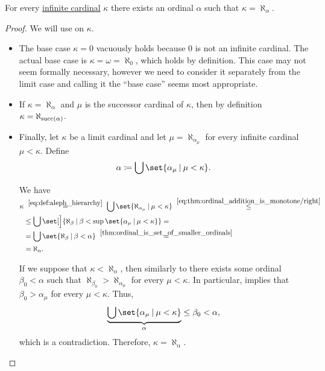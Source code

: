 \begin{proposition}\label{thm:infinite_cardinal_is_aleph}
  For every \hyperref[def:set_finiteness]{infinite cardinal} \( \kappa \) there exists an ordinal \( \alpha \) such that \( \kappa = \aleph_\alpha \).
\end{proposition}
\begin{proof}
  We will use  on \( \kappa \).

  \begin{itemize}
    \item The base case \( \kappa = 0 \) vacuously holds because \( 0 \) is not an infinite cardinal. The actual base case is \( \kappa = \omega = \aleph_0 \), which holds by definition. This case may not seem formally necessary, however we need to consider it separately from the limit case and calling it the \enquote{base case} seems most appropriate.

    \item If \( \kappa = \aleph_\alpha \) and \( \mu \) is the successor cardinal of \( \kappa \), then by definition \( \kappa = \aleph_{\operatorname{succ}(\alpha)} \).

    \item Finally, let \( \kappa \) be a limit cardinal and let \( \mu = \aleph_{\alpha_\mu} \) for every infinite cardinal \( \mu < \kappa \). Define
    \begin{equation*}
      \alpha \coloneqq \bigcup\set{ \alpha_\mu \given \mu < \kappa }.
    \end{equation*}

    We have
    \begin{align*}
      \kappa
      &\reloset {\eqref{eq:def:aleph_hierarchy}} =
      \bigcup\set{ \aleph_{\alpha_\mu} \given \mu < \kappa }
      \reloset {\eqref{eq:thm:ordinal_addition_is_monotone/right}} \leq \\ &\leq
      \bigcup\set[\Big]{ \aleph_\beta \given \beta < \sup\set{ \alpha_\mu \given \mu < \kappa } }
      = \\ &=
      \bigcup\set{ \aleph_\beta \given \beta < \alpha }
      \reloset {\ref{thm:ordinal_is_set_of_smaller_ordinals}} = \\ &=
      \aleph_\alpha.
    \end{align*}

    If we suppose that \( \kappa < \aleph_\alpha \), then similarly to  there exists some ordinal \( \beta_0 < \alpha \) such that \( \aleph_{\beta_0} > \aleph_{\alpha_\mu} \) for every \( \mu < \kappa \). In particular,  implies that \( \beta_0 > \alpha_\mu \) for every \( \mu < \kappa \). Thus,
    \begin{equation*}
      \underbrace{\bigcup\set{ \alpha_\mu \given \mu < \kappa }}_{\alpha} \leq \beta_0 < \alpha,
    \end{equation*}
    which is a contradiction. Therefore, \( \kappa = \aleph_\alpha \).
  \end{itemize}
\end{proof}

